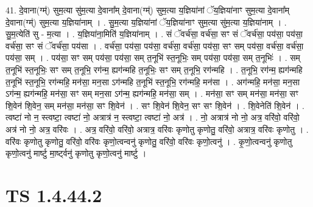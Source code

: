 \documentclass[17pt]{extarticle}
\begin{document}
41. दे॒वाना(ग्म्॑) सुम॒त्या सु॑म॒त्या दे॒वाना᳚म् दे॒वाना(ग्म्॑) सुम॒त्या य॒ज्ञिया॑नां ॅय॒ज्ञिया॑नाꣳ सुम॒त्या दे॒वाना᳚म् दे॒वाना(ग्म्॑) सुम॒त्या य॒ज्ञिया॑नाम् । . सु॒म॒त्या य॒ज्ञिया॑नां ॅय॒ज्ञिया॑नाꣳ सुम॒त्या सु॑म॒त्या य॒ज्ञिया॑नाम् । . सु॒म॒त्येति॑ सु - म॒त्या । . य॒ज्ञिया॑ना॒मिति॑ य॒ज्ञिया॑नाम् । . सं ॅवर्च॑सा॒ वर्च॑सा॒ सꣳ सं ॅवर्च॑सा॒ पय॑सा॒ पय॑सा॒ वर्च॑सा॒ सꣳ सं ॅवर्च॑सा॒ पय॑सा । . वर्च॑सा॒ पय॑सा॒ पय॑सा॒ वर्च॑सा॒ वर्च॑सा॒ पय॑सा॒ सꣳ सम् पय॑सा॒ वर्च॑सा॒ वर्च॑सा॒ पय॑सा॒ सम् । . पय॑सा॒ सꣳ सम् पय॑सा॒ पय॑सा॒ सम् त॒नूभि॑ स्त॒नूभिः॒ सम् पय॑सा॒ पय॑सा॒ सम् त॒नूभिः॑ । . सम् त॒नूभि॑ स्त॒नूभिः॒ सꣳ सम् त॒नूभि॒ रग॑न्म॒ ह्यग॑न्महि त॒नूभिः॒ सꣳ सम् त॒नूभि॒ रग॑न्महि । . त॒नूभि॒ रग॑न्म॒ ह्यग॑न्महि त॒नूभि॑ स्त॒नूभि॒ रग॑न्महि॒ मन॑सा॒ मन॒सा ऽग॑न्महि त॒नूभि॑ स्त॒नूभि॒ रग॑न्महि॒ मन॑सा । . अग॑न्महि॒ मन॑सा॒ मन॒सा ऽग॑न्म॒ ह्यग॑न्महि॒ मन॑सा॒ सꣳ सम् मन॒सा ऽग॑न्म॒ ह्यग॑न्महि॒ मन॑सा॒ सम् । . मन॑सा॒ सꣳ सम् मन॑सा॒ मन॑सा॒ सꣳ शि॒वेन॑ शि॒वेन॒ सम् मन॑सा॒ मन॑सा॒ सꣳ शि॒वेन॑ । . सꣳ शि॒वेन॑ शि॒वेन॒ सꣳ सꣳ शि॒वेन॑ । . शि॒वेनेति॑ शि॒वेन॑ । . त्वष्टा॑ नो न॒ स्त्वष्टा॒ त्वष्टा॑ नो॒ अत्रात्र॑ न॒ स्त्वष्टा॒ त्वष्टा॑ नो॒ अत्र॑ । . नो॒ अत्रात्र॑ नो नो॒ अत्र॒ वरि॑वो॒ वरि॑वो॒ अत्र॑ नो नो॒ अत्र॒ वरि॑वः । . अत्र॒ वरि॑वो॒ वरि॑वो॒ अत्रात्र॒ वरि॑वः कृणोतु कृणोतु॒ वरि॑वो॒ अत्रात्र॒ वरि॑वः कृणोतु । . वरि॑वः कृणोतु कृणोतु॒ वरि॑वो॒ वरि॑वः कृणो॒त्वन्वनु॑ कृणोतु॒ वरि॑वो॒ वरि॑वः कृणो॒त्वनु॑ । . कृ॒णो॒त्वन्वनु॑ कृणोतु कृणो॒त्वनु॑ मार्ष्टु मा॒र्ष्ट्वनु॑ कृणोतु कृणो॒त्वनु॑ मार्ष्टु । \newline
\pagebreak
{}
\section*{ TS 1.4.44.2 }
\end{document}
